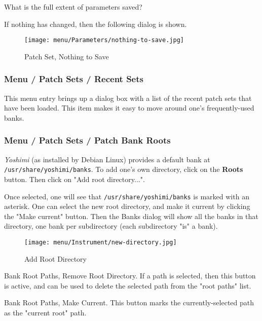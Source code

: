    What is the full extent of parameters saved?

   If nothing has changed, then the following dialog is shown.

\begin{figure}[H]
   \centering 
   \texttt{[image: menu/Parameters/nothing-to-save.jpg]}
   \caption{Patch Set, Nothing to Save}
   \label{fig:yoshimi_menu_nothing_to_save_parameters}
\end{figure}

\subsubsection{Menu / Patch Sets / Recent Sets}
\label{subsubsec:menu_patch_sets_recent_sets}

   This menu entry brings up a dialog box with a list of the recent patch sets
   that have been loaded.  This item makes it easy to move around one's
   frequently-used banks.

\subsubsection{Menu / Patch Sets / Patch Bank Roots}
\label{subsubsec:menu_patch_sets_patch_bank_roots}

   \textsl{Yoshimi} (as installed by Debian Linux) provides a default bank at
   \texttt{/usr/share/yoshimi/banks}.
   To add one's own directory, click on the \textbf{Roots} button.
   Then click on "Add root directory...".

   Once selected, one will see that \texttt{/usr/share/yoshimi/banks}
   is marked with an asterisk.  One can select the new root directory,
   and make it current by clicking the "Make current" button.
   Then the Banks dialog will show all the banks in that directory, one bank
   per subdirectory (each subdirectory "is" a bank).

\begin{figure}[H]
   \centering 
   \texttt{[image: menu/Instrument/new-directory.jpg]}
   \caption{Add Root Directory}
   \label{fig:add_root_directory}
\end{figure}

   Bank Root Paths, Remove Root Directory.
   If a path is selected, then this button is active, and can be used to
   delete the selected path from the "root paths" list.

   Bank Root Paths, Make Current.
   This button marks the currently-selected path as the "current root" path.

